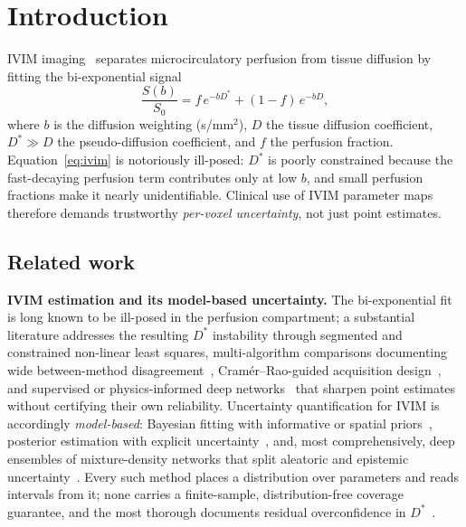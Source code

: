 \documentclass[11pt]{article}
\newcommand{\Dstar}{D^{*}}
\begin{document}
\section{Introduction}
IVIM imaging~\citep{lebihan1988} separates microcirculatory perfusion from tissue
diffusion by fitting the bi-exponential signal
\begin{equation}
\frac{S(b)}{S_0} = f\,e^{-b\Dstar} + (1-f)\,e^{-bD},
\label{eq:ivim}
\end{equation}
where $b$ is the diffusion weighting (s/mm$^2$), $D$ the tissue diffusion
coefficient, $\Dstar \gg D$ the pseudo-diffusion coefficient, and $f$ the
perfusion fraction. Equation~\eqref{eq:ivim} is notoriously ill-posed: $\Dstar$ is
poorly constrained because the fast-decaying perfusion term contributes only at
low $b$, and small perfusion fractions make it nearly unidentifiable. Clinical use
of IVIM parameter maps therefore demands trustworthy \emph{per-voxel uncertainty},
not just point estimates.

\subsection{Related work}\label{sec:related}
\textbf{IVIM estimation and its model-based uncertainty.} The bi-exponential fit is
long known to be ill-posed in the perfusion compartment; a substantial literature
addresses the resulting $\Dstar$ instability through segmented and constrained
non-linear least squares, multi-algorithm comparisons documenting wide
between-method disagreement~\citep{gurneychampion2018}, Cram\'er--Rao-guided
acquisition design~\citep{lemke2011}, and supervised or physics-informed deep
networks~\citep{barbieri2020,kaandorp2021,mastropietro2022} that sharpen point
estimates without certifying their own reliability. Uncertainty quantification for
IVIM is accordingly \emph{model-based}: Bayesian fitting with informative or spatial
priors~\citep{gustafsson2018,spinner2021}, posterior estimation with explicit
uncertainty~\citep{zhang2019}, and, most comprehensively, deep ensembles of
mixture-density networks that split aleatoric and epistemic
uncertainty~\citep{casali2026}. Every such method places a distribution over
parameters and reads intervals from it; none carries a finite-sample,
distribution-free coverage guarantee, and the most thorough documents residual
overconfidence in $\Dstar$~\citep{casali2026}.
\end{document}
